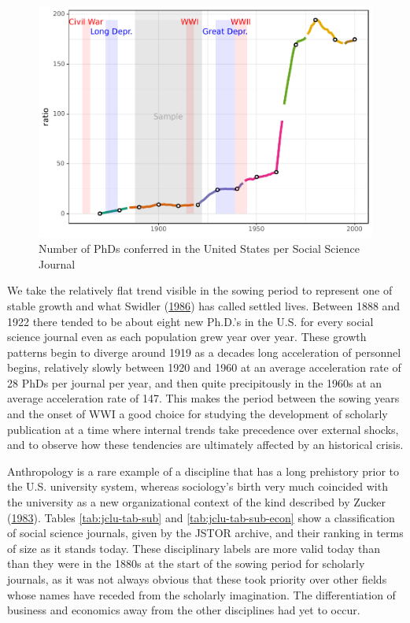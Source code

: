 \documentclass[]{book}
\theoremstyle{definition}
\theoremstyle{definition}
\theoremstyle{definition}
\theoremstyle{remark}
\begin{document}
\begin{figure}

{\centering \includegraphics[width=0.9\linewidth]{04_files/figure-latex/nces/jstorm-1} 

}

\caption{Number of PhDs conferred in the United States per Social Science Journal}\label{fig:nces/jstorm}
\end{figure}

We take the relatively flat trend visible in the sowing period to
represent one of stable growth and what Swidler
(\protect\hyperlink{ref-Swidler1986Culture}{1986}) has called settled
lives. Between 1888 and 1922 there tended to be about eight new Ph.D.'s
in the U.S. for every social science journal even as each population
grew year over year. These growth patterns begin to diverge around 1919
as a decades long acceleration of personnel begins, relatively slowly
between 1920 and 1960 at an average acceleration rate of 28 PhDs per
journal per year, and then quite precipitously in the 1960s at an
average acceleration rate of 147. This makes the period between the
sowing years and the onset of WWI a good choice for studying the
development of scholarly publication at a time where internal trends
take precedence over external shocks, and to observe how these
tendencies are ultimately affected by an historical crisis.

Anthropology is a rare example of a discipline that has a long
prehistory prior to the U.S. university system, whereas sociology's
birth very much coincided with the university as a new organizational
context of the kind described by Zucker
(\protect\hyperlink{ref-Zucker1983Organizations}{1983}). Tables
\ref{tab:jclu-tab-sub} and \ref{tab:jclu-tab-sub-econ} show a
classification of social science journals, given by the JSTOR archive,
and their ranking in terms of size as it stands today. These
disciplinary labels are more valid today than than they were in the
1880s at the start of the sowing period for scholarly journals, as it
was not always obvious that these took priority over other fields whose
names have receded from the scholarly imagination. The differentiation
of business and economics away from the other disciplines had yet to
occur.
\end{document}
